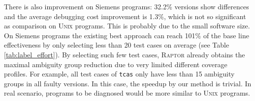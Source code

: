 There is also improvement on Siemens programs: 32.2\% versions show differences and the average debugging cost improvement is 1.3\%, which is not so significant as comparison on \textsc{Unix} programs.
This is probably due to the small software size. On Siemens programs the existing best approach
can reach 101\% of the base line effectiveness by only selecting less than 20 test cases on average (see Table \ref{tab:label_effort}).
By selecting such few test cases, \textsc{Raptor} already obtains the maximal ambiguity group reduction due to very limited different
coverage profiles. For example, all test cases of \texttt{tcas} only have less than 15 ambiguity groups in all faulty versions. In this case,
the speedup by our method is trivial. In real scenario, programs to be diagnosed would be more similar to \textsc{Unix} programs.
